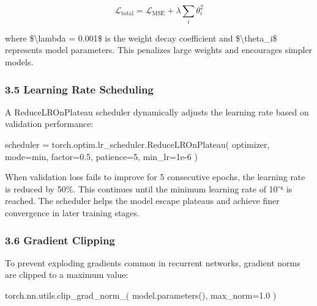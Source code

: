 \documentclass[
]{article}
\newenvironment{Shaded}{}{}
\newcommand{\DecValTok}[1]{\textcolor[rgb]{0.25,0.63,0.44}{#1}}
\newcommand{\FloatTok}[1]{\textcolor[rgb]{0.25,0.63,0.44}{#1}}
\newcommand{\NormalTok}[1]{#1}
\newcommand{\OperatorTok}[1]{\textcolor[rgb]{0.40,0.40,0.40}{#1}}
\newcommand{\StringTok}[1]{\textcolor[rgb]{0.25,0.44,0.63}{#1}}
\begin{document}
\[\mathcal{L}_{\text{total}} = \mathcal{L}_{\text{MSE}} + \lambda \sum_{i} \theta_i^2\]

where \$\textbackslash lambda = 0.001\$ is the weight decay coefficient
and \$\textbackslash theta\_i\$ represents model parameters. This
penalizes large weights and encourages simpler models.

\subsubsection{3.5 Learning Rate
Scheduling}\label{35-learning-rate-scheduling}

A ReduceLROnPlateau scheduler dynamically adjusts the learning rate
based on validation performance:

\begin{Shaded}
\begin{Highlighting}[]
\NormalTok{scheduler }\OperatorTok{=}\NormalTok{ torch.optim.lr\_scheduler.ReduceLROnPlateau(}
\NormalTok{    optimizer,}
\NormalTok{    mode}\OperatorTok{=}\StringTok{\textquotesingle{}min\textquotesingle{}}\NormalTok{,}
\NormalTok{    factor}\OperatorTok{=}\FloatTok{0.5}\NormalTok{,}
\NormalTok{    patience}\OperatorTok{=}\DecValTok{5}\NormalTok{,}
\NormalTok{    min\_lr}\OperatorTok{=}\FloatTok{1e{-}6}
\NormalTok{)}
\end{Highlighting}
\end{Shaded}

When validation loss fails to improve for 5 consecutive epochs, the
learning rate is reduced by 50\%. This continues until the minimum
learning rate of 10⁻⁶ is reached. The scheduler helps the model escape
plateaus and achieve finer convergence in later training stages.

\subsubsection{3.6 Gradient Clipping}\label{36-gradient-clipping}

To prevent exploding gradients common in recurrent networks, gradient
norms are clipped to a maximum value:

\begin{Shaded}
\begin{Highlighting}[]
\NormalTok{torch.nn.utils.clip\_grad\_norm\_(}
\NormalTok{    model.parameters(),}
\NormalTok{    max\_norm}\OperatorTok{=}\FloatTok{1.0}
\NormalTok{)}
\end{Highlighting}
\end{Shaded}
\end{document}
